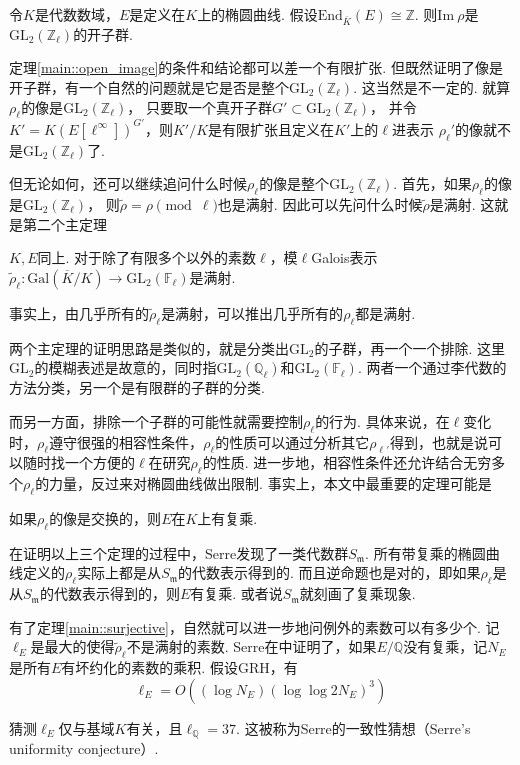 \begin{cthm}
    令$K$是代数数域，$E$是定义在$K$上的椭圆曲线. 假设$\mathrm{End}_{\overline{K}}(E) \cong \mathbb{Z}$. 则$\mathrm{Im}\ \rho$是$\mathrm{GL}_2(\mathbb{Z}_{\ell})$的开子群. \label{main::open_image}
\end{cthm}

定理\ref{main::open_image}的条件和结论都可以差一个有限扩张.
但既然证明了像是开子群，有一个自然的问题就是它是否是整个$\mathrm{GL}_2(\mathbb{Z}_{\ell})$.
这当然是不一定的. 就算$\rho_{\ell}$的像是$\mathrm{GL}_2(\mathbb{Z}_{\ell})$，
只要取一个真开子群$G'\subset \mathrm{GL}_2(\mathbb{Z}_{\ell})$，
并令$K' = K(E[\ell^{\infty}])^{G'}$，则$K'/K$是有限扩张且定义在$K'$上的$\ell$进表示
$\rho_{\ell}'$的像就不是$\mathrm{GL}_2(\mathbb{Z}_{\ell})$了.

但无论如何，还可以继续追问什么时候$\rho_{\ell}$的像是整个$\mathrm{GL}_2(\mathbb{Z}_{\ell})$.
首先，如果$\rho_{\ell}$的像是$\mathrm{GL}_2(\mathbb{Z}_{\ell})$，
则$\tilde{\rho} = \rho \pmod{\ell}$也是满射.
因此可以先问什么时候$\tilde{\rho}$是满射. 这就是第二个主定理

\begin{cthm}
    $K, E$同上. 对于除了有限多个以外的素数$\ell$，模$\ell$Galois表示$\tilde{\rho}_{\ell}: \mathrm{Gal}(\overline{K}/K)\to \mathrm{GL}_2(\mathbb{F}_{\ell})$是满射. \label{main::surjective}
\end{cthm}

事实上，由几乎所有的$\tilde{\rho}_{\ell}$是满射，可以推出几乎所有的$\rho_{\ell}$都是满射.

两个主定理的证明思路是类似的，就是分类出$\mathrm{GL}_2$的子群，再一个一个排除. 这里$\mathrm{GL}_2$的模糊表述是故意的，同时指$\mathrm{GL}_2(\mathbb{Q}_{\ell})$和$\mathrm{GL}_2(\mathbb{F}_{\ell})$. 两者一个通过李代数的方法分类，另一个是有限群的子群的分类.

而另一方面，排除一个子群的可能性就需要控制$\rho_{\ell}$的行为. 具体来说，在$\ell$变化时，$\rho_{\ell}$遵守很强的相容性条件，$\rho_{\ell}$的性质可以通过分析其它$\rho_{\ell'}$得到，也就是说可以随时找一个方便的$\ell$在研究$\rho_{\ell}$的性质. 进一步地，相容性条件还允许结合无穷多个$\rho_{\ell}$的力量，反过来对椭圆曲线做出限制. 事实上，本文中最重要的定理可能是

\begin{cthm}
    如果$\rho_{\ell}$的像是交换的，则$E$在$K$上有复乘.
\end{cthm}

在证明以上三个定理的过程中，Serre发现了一类代数群$S_{\mathfrak{m}}$. 所有带复乘的椭圆曲线定义的$\rho_{\ell}$实际上都是从$S_{\mathfrak{m}}$的代数表示得到的. 而且逆命题也是对的，即如果$\rho_{\ell}$是从$S_{\mathfrak{m}}$的代数表示得到的，则$E$有复乘. 或者说$S_{\mathfrak{m}}$就刻画了复乘现象.

有了定理\ref{main::surjective}，自然就可以进一步地问例外的素数可以有多少个.
记$\ell_{E}$是最大的使得$\tilde{\rho}_{\ell}$不是满射的素数.
Serre在\parencite{serre1981quelques}中证明了，如果$E/\mathbb{Q}$没有复乘，记$N_E$是所有$E$有坏约化的素数的乘积.
假设GRH，有
\begin{equation}
    \ell_{E} = O((\log N_E)(\log \log 2N_E)^3)
\end{equation}

猜测$\ell_{E}$仅与基域$K$有关，且$\ell_{\mathbb{Q}}=37$.
这被称为Serre的一致性猜想（Serre's uniformity conjecture）.
